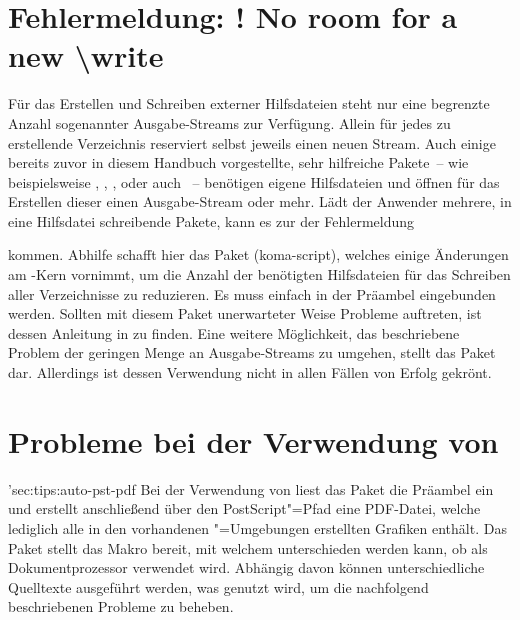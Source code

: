 \section{Fehlermeldung: ! No room for a new \textbackslash write}
%
%
Für das Erstellen und Schreiben externer Hilfsdateien steht  nur 
eine begrenzte Anzahl sogenannter Ausgabe-Streams zur Verfügung. Allein für 
jedes zu erstellende Verzeichnis reserviert  selbst jeweils einen 
neuen Stream. Auch einige bereits zuvor in diesem Handbuch vorgestellte, sehr 
hilfreiche Pakete~-- wie beispielsweise , , 
,  oder auch ~-- 
benötigen eigene Hilfsdateien und öffnen für das Erstellen dieser einen 
Ausgabe-Stream oder mehr. Lädt der Anwender mehrere, in eine Hilfsdatei 
schreibende Pakete, kann es zur der Fehlermeldung
%
\begin{quoting}
\end{quoting}
%
kommen. Abhilfe schafft hier das Paket (koma-script), welches 
einige Änderungen am -Kern vornimmt, um die Anzahl der benötigten 
Hilfsdateien für das Schreiben aller Verzeichnisse zu reduzieren. Es muss 
einfach in der Präambel eingebunden werden. Sollten mit diesem Paket 
unerwarteter Weise Probleme auftreten, ist dessen Anleitung in \scrguide zu 
finden. Eine weitere Möglichkeit, das beschriebene Problem der geringen Menge 
an Ausgabe-Streams zu umgehen, stellt das Paket  dar. 
Allerdings ist dessen Verwendung nicht in allen Fällen von Erfolg gekrönt.

\section{Probleme bei der Verwendung von }
\manualhyperdef'{sec:tips:auto-pst-pdf}
%
%
Bei der Verwendung von  liest das Paket  
die Präambel ein und erstellt anschließend über den PostScript"=Pfad 
 eine PDF-Datei, 
welche lediglich alle in den vorhandenen "=Umgebungen 
erstellten Grafiken enthält. 
Das Paket  
stellt das Makro  bereit, mit welchem unterschieden werden kann, 
ob  als Dokumentprozessor verwendet wird. Abhängig davon 
können unterschiedliche Quelltexte ausgeführt werden, was genutzt wird, um die 
nachfolgend beschriebenen Probleme zu beheben.
%
\begin{quoting}
\begin{Code}
\usepackage{ifpdf}
\end{Code}
\end{quoting}

